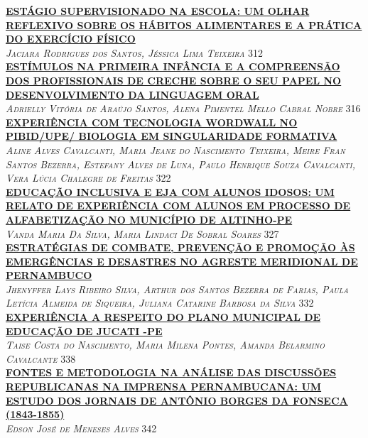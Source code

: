 \noindent \textsc{\hyperlink{trabalhos/250244.pdf.1}{\textbf{ESTÁGIO SUPERVISIONADO NA ESCOLA: UM OLHAR REFLEXIVO SOBRE OS HÁBITOS ALIMENTARES E A PRÁTICA DO EXERCÍCIO FÍSICO }}}\\ 
\noindent \textsc{\textit{Jaciara Rodrigues dos Santos, Jéssica Lima Teixeira}} \hfill 312\\ 

\noindent \textsc{\hyperlink{trabalhos/251652.pdf.1}{\textbf{ESTÍMULOS NA PRIMEIRA INFÂNCIA E A COMPREENSÃO DOS PROFISSIONAIS DE CRECHE SOBRE O SEU PAPEL  NO DESENVOLVIMENTO DA LINGUAGEM ORAL}}}\\ 
\noindent \textsc{\textit{Adrielly Vitória de Araújo Santos, Alena Pimentel Mello Cabral Nobre}} \hfill 316\\ 

\noindent \textsc{\hyperlink{trabalhos/251338.pdf.1}{\textbf{EXPERIÊNCIA COM TECNOLOGIA WORDWALL NO  PIBID/UPE/ BIOLOGIA EM SINGULARIDADE FORMATIVA}}}\\ 
\noindent \textsc{\textit{Aline Alves Cavalcanti, Maria Jeane do Nascimento Teixeira, Meire Fran Santos Bezerra, Estefany Alves de Luna, Paulo Henrique Souza Cavalcanti, Vera Lúcia Chalegre de Freitas}} \hfill 322\\ 

\noindent \textsc{\hyperlink{trabalhos/251802.pdf.1}{\textbf{EDUCAÇÃO INCLUSIVA E EJA COM ALUNOS IDOSOS: UM RELATO DE EXPERIÊNCIA COM ALUNOS EM PROCESSO DE ALFABETIZAÇÃO NO MUNICÍPIO DE ALTINHO-PE }}}\\ 
\noindent \textsc{\textit{Vanda Maria Da Silva, Maria Lindaci De Sobral Soares}} \hfill 327\\ 

\noindent \textsc{\hyperlink{trabalhos/250359.pdf.1}{\textbf{ESTRATÉGIAS DE COMBATE, PREVENÇÃO E PROMOÇÃO ÀS EMERGÊNCIAS E DESASTRES NO AGRESTE MERIDIONAL DE PERNAMBUCO}}}\\ 
\noindent \textsc{\textit{Jhenyffer Lays Ribeiro Silva, Arthur dos Santos Bezerra de Farias, Paula Letícia Almeida de Siqueira, Juliana Catarine Barbosa da Silva}} \hfill 332\\ 

\noindent \textsc{\hyperlink{trabalhos/250248.pdf.1}{\textbf{EXPERIÊNCIA A RESPEITO DO PLANO MUNICIPAL DE EDUCAÇÃO DE JUCATI -PE}}}\\ 
\noindent \textsc{\textit{Taise Costa do Nascimento, Maria Milena Pontes, Amanda Belarmino Cavalcante}} \hfill 338\\ 

\noindent \textsc{\hyperlink{trabalhos/251837.pdf.1}{\textbf{FONTES E METODOLOGIA NA ANÁLISE DAS DISCUSSÕES REPUBLICANAS NA IMPRENSA PERNAMBUCANA: UM ESTUDO DOS JORNAIS DE ANTÔNIO BORGES DA FONSECA (1843-1855)}}}\\ 
\noindent \textsc{\textit{Edson José de Meneses Alves}} \hfill 342\\ 

